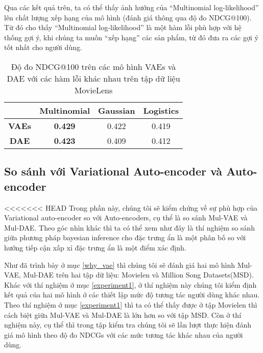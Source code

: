        Qua các kết quả trên, ta có thể thấy ảnh hưởng của ``Multinomial log-likelihood'' lên chất lượng xếp hạng của mô hình (đánh giá thông qua độ đo NDCG@100). 
        Từ đó cho thấy ``Multinomial log-likelihood'' là một hàm lỗi phù hợp với hệ thống gợi ý, khi chúng ta muốn ``xếp hạng'' các sản phẩm, từ đó đưa ra các gợi ý tốt nhất cho người dùng.

        \begin{table}[]
        \centering
            \begin{tabular}{|c|c|c|c|}
            \hline
                          & \textbf{Multinomial}                  & \textbf{Gaussian}            & \textbf{Logistics}           \\ \hline
            \textbf{VAEs} &  \textbf{0.429} & 0.422 &  0.419 \\ \hline
            \textbf{DAE}  & \textbf{0.423}                        & 0.409                        & 0.412                        \\ \hline
            \end{tabular}
        \label{table_comparelikelihood}
        \caption[]{Độ đo NDCG@100 trên các mô hình VAEs và DAE với các hàm lỗi khác nhau trên tập dữ liệu MovieLens}
        \end{table}



    \subsection{So sánh với Variational Auto-encoder và Auto-encoder}
<<<<<<< HEAD
    Trong phần này, chúng tôi sẽ kiểm chứng về sự phù hợp của Variational auto-encoder so với Auto-encoders, cụ thể là so sánh Mul-VAE và Mul-DAE.
    Theo góc nhìn khác thì ta có thể xem như đây là thí nghiệm so sánh giữa phương pháp bayesian inference cho đặc trưng ẩn là một phân bố so với hướng tiếp cận xấp xỉ đặc trưng ẩn là một điểm xác định.

    Như đã trình bày ở mục \ref{why_vae} thì chúng tôi sẽ đánh giá hai mô hình Mul-VAE, Mul-DAE trên hai tập dữ liệu: Movielen và Million Song Datasets(MSD).
    Khác với thí nghiệm ở mục \ref{experiment1}, ở thí nghiệm này chúng tôi kiểm định kết quả của hai mô hình ở các thiết lập mức độ tương tác người dùng khác nhau.
    Theo thí nghiệm ở mục \ref{experiment1} thì ta có thể thấy được ở tập Movielen thì cách biệt giữa Mul-VAE và Mul-DAE là lớn hơn so với tập MSD.
    Còn ở thí nghiệm này, cụ thể thì trong tập kiểm tra chúng tôi sẽ lần lượt thực hiện đánh giá mô hình theo độ đo NDCGs với các mức tương tác khác nhau của người dùng.
    

